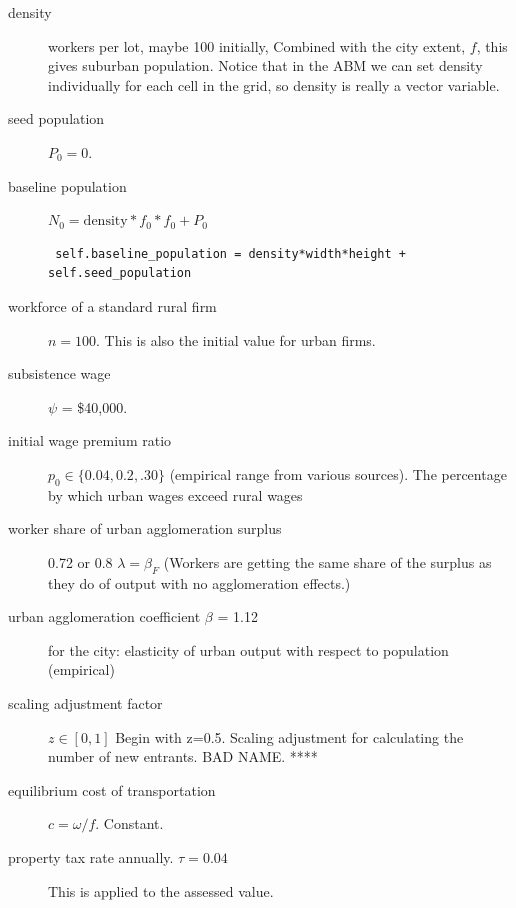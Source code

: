 \begin{description}
\item [density] workers per lot, maybe 100 initially, Combined with the city extent, $f$, this gives suburban population. %
Notice that in the ABM we can set density individually for each cell in the grid, so density is really a vector variable.  %
\item [seed population] $P_0=0$. %
\item [baseline population]  $N_0=\mathrm{density} * f_0 * f_0 + P_0$ 
\begin{lstlisting}
 self.baseline_population = density*width*height + self.seed_population
\end{lstlisting}

\item [workforce of a standard rural firm] $n=100$. This is also the initial value for urban firms.


\item [subsistence wage] $\psi$ = \$40,000. %


\item [initial wage premium ratio] $p_0\in\{0.04,0.2,.30\}$ (empirical range from various sources). The percentage by which urban wages exceed rural wages 

\item [worker share of urban agglomeration surplus] 0.72 or 0.8 $\lambda=\beta_F$ (Workers are getting the same share of the surplus as they do of output with no agglomeration effects.) 
\item [urban agglomeration coefficient $\beta$ = 1.12] for the city: elasticity of urban output with respect to population (empirical)

\item [scaling adjustment factor] $z\in[0,1]$ Begin with z=0.5. Scaling adjustment for calculating the number of new entrants. BAD NAME. ****

\item [equilibrium cost of transportation] $c = \omega/f$. Constant.
\item [property tax rate annually. $\tau=0.04$] This is applied to the assessed value.


\end{description}
